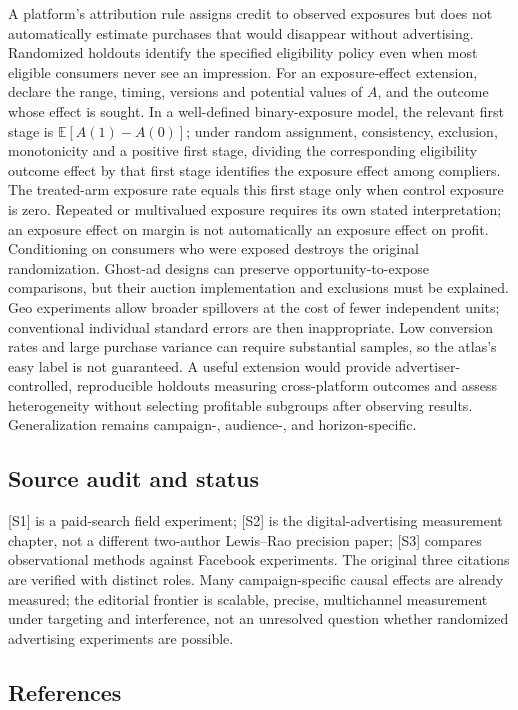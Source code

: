 \documentclass[11pt,a4paper]{article}
\begin{document}
A platform's attribution rule assigns credit to observed exposures but does not automatically estimate purchases that would disappear without advertising. Randomized holdouts identify the specified eligibility policy even when most eligible consumers never see an impression. For an exposure-effect extension, declare the range, timing, versions and potential values of $A$, and the outcome whose effect is sought. In a well-defined binary-exposure model, the relevant first stage is $\mathbb E[A(1)-A(0)]$; under random assignment, consistency, exclusion, monotonicity and a positive first stage, dividing the corresponding eligibility outcome effect by that first stage identifies the exposure effect among compliers. The treated-arm exposure rate equals this first stage only when control exposure is zero. Repeated or multivalued exposure requires its own stated interpretation; an exposure effect on margin is not automatically an exposure effect on profit. Conditioning on consumers who were exposed destroys the original randomization. Ghost-ad designs can preserve opportunity-to-expose comparisons, but their auction implementation and exclusions must be explained. Geo experiments allow broader spillovers at the cost of fewer independent units; conventional individual standard errors are then inappropriate. Low conversion rates and large purchase variance can require substantial samples, so the atlas's easy label is not guaranteed. A useful extension would provide advertiser-controlled, reproducible holdouts measuring cross-platform outcomes and assess heterogeneity without selecting profitable subgroups after observing results. Generalization remains campaign-, audience-, and horizon-specific.

\subsection*{Source audit and status}

[S1] is a paid-search field experiment; [S2] is the digital-advertising measurement chapter, not a different two-author Lewis--Rao precision paper; [S3] compares observational methods against Facebook experiments. The original three citations are verified with distinct roles. Many campaign-specific causal effects are already measured; the editorial frontier is scalable, precise, multichannel measurement under targeting and interference, not an unresolved question whether randomized advertising experiments are possible.

\subsection*{References}
\end{document}
